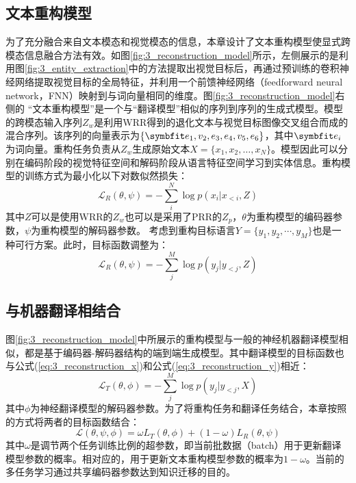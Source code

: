 \subsection{文本重构模型}
\label{sec:3_sentence_reconstruction}

为了充分融合来自文本模态和视觉模态的信息，本章设计了文本重构模型使显式跨模态信息融合方法有效。如图\ref{fig:3_reconstruction_model}所示，左侧展示的是利用图\ref{fig:3_entity_extraction}中的方法提取出视觉目标后，再通过预训练的卷积神经网络提取视觉目标的全局特征，并利用一个前馈神经网络（feedforward neural network，FNN）映射到与词向量相同的维度。图\ref{fig:3_reconstruction_model}右侧的 “文本重构模型”是一个与“翻译模型”相似的序列到序列的生成式模型。模型的跨模态输入序列$Z_{w}$是利用WRR得到的退化文本与视觉目标图像交叉组合而成的混合序列。该序列的向量表示为$\{\Vector{e_1,v_2,e_3,e_4,v_5,e_6}\}$，其中$\Vector{e_i}$为词向量。重构任务负责从$Z_{w}$生成原始文本$X=\{x_1,x_2,…,x_N\}$。模型因此可以分别在编码阶段的视觉特征空间和解码阶段从语言特征空间学习到实体信息。重构模型的训练方式为最小化以下对数似然损失：
\begin{equation}
    \mathcal{L}_R(\theta, \psi)=-\sum_i^N \log p(x_i|x_{<i},Z)
    \label{eq:3_reconstruction_x}
\end{equation}
其中$Z$可以是使用WRR的$Z_{w}$也可以是采用了PRR的$Z_{p}$，$\theta$为重构模型的编码器参数，$\psi$为重构模型的解码器参数。
考虑到重构目标语言$Y=\{y_1,y_2,\cdots,y_M\}$也是一种可行方案。此时，目标函数调整为：
\begin{equation}
    \mathcal{L}_R(\theta, \psi)=-\sum_j^M \log p(y_j|y_{<j},Z)
    \label{eq:3_reconstruction_y}
\end{equation}

\subsection{与机器翻译相结合}
\label{sec:3_multitask}
图\ref{fig:3_reconstruction_model}中所展示的重构模型与一般的神经机器翻译模型相似，都是基于编码器-解码器结构的端到端生成模型。其中翻译模型的目标函数也与公式(\ref{eq:3_reconstruction_x})和公式(\ref{eq:3_reconstruction_y})相近：
\begin{equation}
    \mathcal{L}_T(\theta, \phi)=-\sum_j^M \log p(y_j|y_{<j},X)
    \label{eq:3_translation}
\end{equation}
其中$\phi$为神经翻译模型的解码器参数。为了将重构任务和翻译任务结合，本章按照的方式将两者的目标函数结合：
\begin{equation}
    \mathcal{L}(\theta, \psi, \phi)=\omega L_T(\theta, \phi) + (1-\omega)L_R(\theta, \psi)
    \label{eq:3_combine_sr}
\end{equation}
其中$\omega$是调节两个任务训练比例的超参数，即当前批数据（batch）用于更新翻译模型参数的概率。相对应的，用于更新文本重构模型参数的概率为$1-\omega$。当前的多任务学习通过共享编码器参数达到知识迁移的目的。

